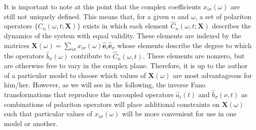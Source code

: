 It is important to note at this point that the complex coefficients $x_{i\sigma}(\omega)$ are still not uniquely defined. This means that, for a given $n$ and $\omega$, a set of polariton operators $\{\hat{C}_n(\omega,t;\mathbf{X})\}$ exists in which each element $\hat{C}_n(\omega,t;\mathbf{X})$ describes the dynamics of the system with equal validity. These elements are indexed by the matrices $\mathbf{X}(\omega) = \sum_{i\sigma}x_{i\sigma}(\omega)\hat{\mathbf{e}}_i\hat{\mathbf{e}}_\sigma$ whose elements describe the degree to which the operators $\hat{b}_\sigma(\omega)$ contribute to $\hat{C}_n(\omega,t)$. These elements are nonzero, but are otherwise free to vary in the complex plane. Therefore, it is up to the author of a particular model to choose which values of $\mathbf{X}(\omega)$ are most advantageous for him/her. However, as we will see in the following, the inverse Fano transformations that reproduce the uncoupled operators $\hat{a}_i(t)$ and $\hat{b}_\sigma(\nu,t)$ as combinations of polariton operators will place additional constraints on $\mathbf{X}(\omega)$ such that particular values of $x_{i\sigma}(\omega)$ will be more convenient for use in one model or another.


